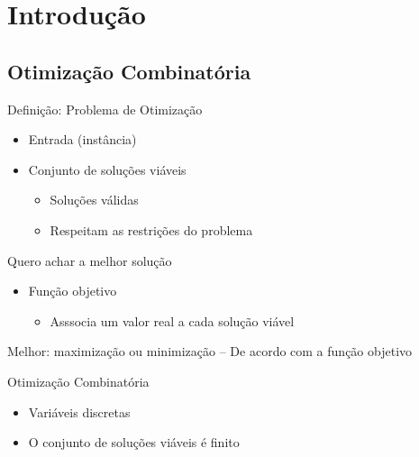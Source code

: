 \chapter{Introdução}

\section{Otimização Combinatória}

Definição: Problema de Otimização

\begin{itemize}
    \item Entrada (instância)
    \item Conjunto de soluções viáveis
          \begin{itemize}
              \item Soluções válidas
              \item Respeitam as restrições do problema
          \end{itemize}
\end{itemize}

Quero achar a melhor solução

\begin{itemize}
    \item Função objetivo
          \begin{itemize}
              \item Asssocia um valor real a cada solução viável
          \end{itemize}
\end{itemize}

Melhor: maximização ou minimização -- De acordo com a função objetivo

Otimização Combinatória

\begin{itemize}
    \item Variáveis discretas
    \item O conjunto de soluções viáveis é finito
\end{itemize}

